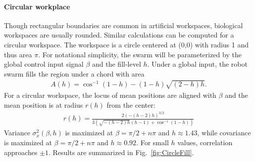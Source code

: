 \paragraph{Circular workplace}
Though rectangular boundaries are common in artificial workspaces, biological workspaces are usually rounded.
Similar calculations can be computed for a circular workspace.  The workspace is a circle centered at (0,0) with radius 1 and thus area $\pi$.
For notational simplicity, the swarm will be parameterized by the global control input signal $\beta$ and the fill-level $h$.  
Under a global input, the robot swarm fills the region under a chord with area
\begin{align}
A(h) = \cos^{-1}(1-h)-(1-h) \sqrt{(2-h) h}.
\end{align}
For a circular workspace, the locus of mean positions are aligned with $\beta$ and the mean position is at radius $r(h)$ from the center:
\begin{align}
r(h) = \frac{2 (-(h-2) h)^{3/2}}{3 \left(\sqrt{-(h-2) h} (h-1)+\cos ^{-1}(1-h)\right)}
\end{align}
Variance $\sigma^2_x(\beta,h)$ is maximized at $\beta = \pi/2+n \pi$ and $h\approx1.43$, while covariance is maximized at $\beta = \pi/2+n \pi$ and $h\approx0.92.$ For small $h$ values, correlation approaches $\pm1$. Results are summarized in Fig.~\ref{fig:CircleFill}.

%


